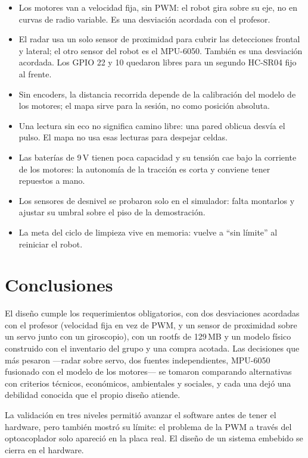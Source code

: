 \documentclass[11pt,a4paper]{article}
\begin{document}
\begin{itemize}
  \item Los motores van a velocidad fija, sin PWM: el robot gira sobre su
        eje, no en curvas de radio variable. Es una desviación acordada con
        el profesor.
  \item El radar usa un solo sensor de proximidad para cubrir las detecciones
        frontal y lateral; el otro sensor del robot es el MPU-6050. También
        es una desviación acordada. Los GPIO 22 y 10 quedaron libres para un
        segundo HC-SR04 fijo al frente.
  \item Sin encoders, la distancia recorrida depende de la calibración del
        modelo de los motores; el mapa sirve para la sesión, no como posición
        absoluta.
  \item Una lectura sin eco no significa camino libre: una pared oblicua
        desvía el pulso. El mapa no usa esas lecturas para despejar celdas.
  \item Las baterías de 9\,V tienen poca capacidad y su tensión cae bajo la
        corriente de los motores: la autonomía de la tracción es corta y
        conviene tener repuestos a mano.
  \item Los sensores de desnivel se probaron solo en el simulador: falta
        montarlos y ajustar su umbral sobre el piso de la demostración.
  \item La meta del ciclo de limpieza vive en memoria: vuelve a ``sin
        límite'' al reiniciar el robot.
\end{itemize}

\section{Conclusiones}

El diseño cumple los requerimientos obligatorios, con dos desviaciones
acordadas con el profesor (velocidad fija en vez de PWM, y un sensor de
proximidad sobre un servo junto con un giroscopio), con un rootfs de 129\,MB
y un modelo físico construido con el inventario del grupo y una compra
acotada.
Las decisiones que más pesaron ---radar sobre servo, dos fuentes independientes,
MPU-6050 fusionado con el modelo de los motores--- se tomaron comparando
alternativas con criterios técnicos, económicos, ambientales y sociales, y
cada una dejó una debilidad conocida que el propio diseño atiende.

La validación en tres niveles permitió avanzar el software antes de tener el
hardware, pero también mostró su límite: el problema de la PWM a través del
optoacoplador solo apareció en la placa real. El diseño de un sistema
embebido se cierra en el hardware.
\end{document}
